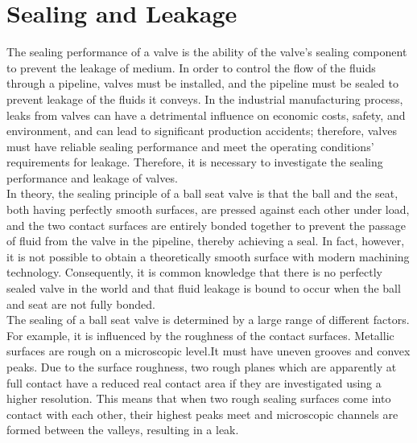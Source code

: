 \section{Sealing and Leakage}
\label{Sealing and Leakage}
The sealing performance of a valve is the ability of the valve's sealing component to prevent the leakage 
of medium. In order to control the flow of the fluids through a pipeline, valves must be installed, and 
the pipeline must be sealed to prevent leakage of the fluids it conveys. In the industrial manufacturing 
process, leaks from valves can have a detrimental influence on economic costs, safety, and environment, 
and can lead to significant production accidents; therefore, valves must have reliable sealing performance 
and meet the operating conditions' requirements 
for leakage. Therefore, it is necessary to investigate the sealing performance and leakage of valves.\\

In theory, the sealing principle of a ball seat valve is that the ball and the seat, both having 
perfectly smooth surfaces, are pressed against each other under load, and the two contact surfaces are 
entirely bonded together to prevent the passage of fluid from the valve in the pipeline, thereby achieving
a seal. In fact, however, it is not possible to obtain a theoretically smooth surface with 
modern machining technology.\cite{Sealing1} Consequently, it is common knowledge that there is no perfectly sealed valve in the world 
and that fluid leakage is bound to occur when the ball and seat are not fully bonded.\\

The sealing of a ball seat valve is determined by a large range of different factors.\cite{fischer2021influence}
For example, it is influenced by the roughness of the contact surfaces. Metallic surfaces are rough 
on a microscopic level.It must have uneven grooves and convex peaks. Due to the surface roughness, two rough 
planes which are apparently at full contact have a reduced real contact area if they 
are investigated using a higher resolution.\cite{fischer2021geometry} This means that when two 
rough sealing surfaces come into contact with each other,
 their highest peaks meet and microscopic channels are formed between the valleys, resulting in a leak.\\

